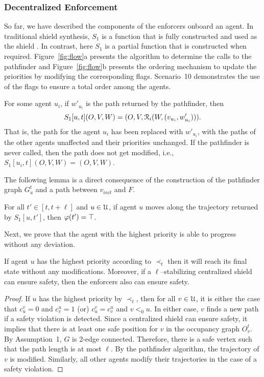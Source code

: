 \subsubsection*{Decentralized Enforcement}

So far, we have described the components of the enforcers onboard an agent. In traditional shield synthesis, $S_1$ is a function that is fully constructed and used as the shield \cite{BloemKKW15}. In contrast, here $S_1$ is a partial function that is constructed when required.  Figure~\ref{fig:flow}a presents the algorithm to determine the calls to the pathfinder and Figure~\ref{fig:flow}b presents the ordering mechanism to update the priorities by modifying the corresponding flags. Scenario~10 demonstrates the use of the flags to ensure a total order among the agents.

For some agent $u_i$, if $w'_{u_i}$ is the path returned by the pathfinder, then $$S_1[u,t](O,V,W)=(O,V,\mathcal{R}_i(W,(v_{u_i},w'_{u_i}))).$$ That is, the path for the agent $u_i$ has been replaced with $w'_{u_i}$, with the paths of the other agents unaffected and their priorities unchanged.
If the pathfinder is never called, then the path does not get modified, i.e., $S_1[u_i,t](O,V,W) = (O,V,W)$.

The following lemma is a direct consequence of the construction of the pathfinder graph $G_{u}^t$ and a path between $v_{init}$ and $F$. 
\begin{lemma}
For all $t' \in [t,t+\ell]$ and $u \in \mathcal{U}$, if agent $u$ moves along the trajectory returned by $S_1[u,t']$, then $\varphi(t') = \top$.
\label{lemma:correct}
\end{lemma}
 
\noindent Next, we prove that the agent with the highest priority is able to progress without any deviation.
\begin{lemma}
If agent $u$ has the highest priority according to $\prec_t$ then it will reach its final state without any modifications. Moreover, if a $\ell$--stabilizing centralized shield can ensure safety, then the enforcers also can ensure safety.
\label{lemma:hp_lt}
\end{lemma}
\begin{proof}
If $u$ has the highest priority by $\prec_t$, then for all $v \in \mathcal{U}$, it is either the case that $c_u^v=0$ and $c_v^u=1$ (or) $c_u^v = c_v^u$ and $v <_{0} u$.
In either case, $v$ finds a new path if a safety violation is detected. Since a centralized shield can ensure safety, it implies that there is at least one safe position for $v$ in the occupancy graph $O^t_v$. By Assumption~1, $G$ is 2-edge connected. Therefore, there is a safe vertex such that the path length is at most $\ell$. By the pathfinder algorithm, the trajectory of $v$ is modified. Similarly, all other agents modify their trajectories in the case of a safety violation. 
\end{proof}

